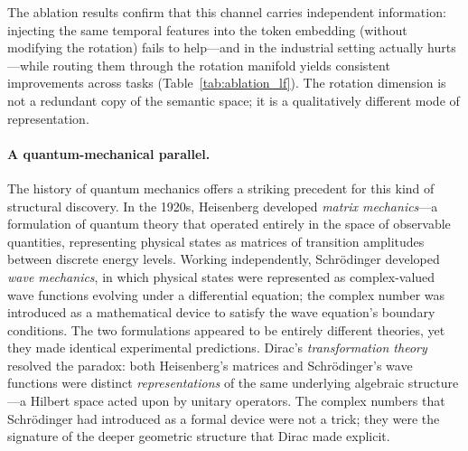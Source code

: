 \documentclass{article}
\begin{document}
The ablation results confirm that this channel carries independent
information: injecting the same temporal features into the token embedding
(without modifying the rotation) fails to help---and in the industrial
setting actually hurts---while routing them through the rotation manifold
yields consistent improvements across tasks (Table~\ref{tab:ablation_lf}).
The rotation dimension is not a redundant copy of the semantic space; it is
a qualitatively different mode of representation.

\paragraph{A quantum-mechanical parallel.}
The history of quantum mechanics offers a striking precedent for this kind
of structural discovery. In the 1920s, Heisenberg developed
\emph{matrix mechanics}---a formulation of quantum theory that operated
entirely in the space of observable quantities, representing physical states
as matrices of transition amplitudes between discrete energy levels. Working
independently, Schr\"{o}dinger developed \emph{wave mechanics}, in which
physical states were represented as complex-valued wave functions evolving
under a differential equation; the complex number was introduced as a
mathematical device to satisfy the wave equation's boundary conditions.
The two formulations appeared to be entirely different theories, yet they
made identical experimental predictions. Dirac's \emph{transformation
theory} resolved the paradox: both Heisenberg's matrices and Schr\"{o}dinger's
wave functions were distinct \emph{representations} of the same underlying
algebraic structure---a Hilbert space acted upon by unitary operators. The
complex numbers that Schr\"{o}dinger had introduced as a formal device were
not a trick; they were the signature of the deeper geometric structure that
Dirac made explicit.
\end{document}
